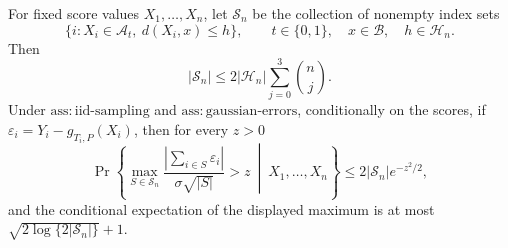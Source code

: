 For fixed score values \(X_1,\ldots,X_n\), let \(\mathscr S_n\) be the collection of nonempty index sets
\[
 \{i:X_i\in\mathcal A_t,\ d(X_i,x)\le h\},\qquad t\in\{0,1\},\quad x\in\mathcal B,\quad h\in\mathcal H_n.
\]
Then
\[
 |\mathscr S_n|\le 2|\mathcal H_n|\sum_{j=0}^3\binom nj.
\]
Under \(\mathrm{ass:iid\text{-}sampling}\) and \(\mathrm{ass:gaussian\text{-}errors}\), conditionally on the scores, if \(\varepsilon_i=Y_i-g_{T_i,P}(X_i)\), then for every \(z>0\)
\[
 \Pr\left\{\max_{S\in\mathscr S_n}\frac{|\sum_{i\in S}\varepsilon_i|}{\sigma\sqrt{|S|}}>z\ \middle|\ X_1,\ldots,X_n\right\}
 \le2|\mathscr S_n|e^{-z^2/2},
\]
and the conditional expectation of the displayed maximum is at most \(\sqrt{2\log\{2|\mathscr S_n|\}}+1\).